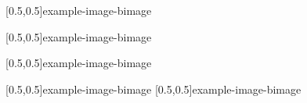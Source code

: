 



\graphicspath{{Figures/}{Figures/Iceland}}


\subtitle{Day 2}
\date{08.10.2019}


    
    
    [0.5,0.5]{example-image-b}{image}
    
    [0.5,0.5]{example-image-b}{image}
    
    [0.5,0.5]{example-image-b}{image}
    
    [0.5,0.5]{example-image-b}{image}
%     
    [0.5,0.5]{example-image-b}{image}
%     

